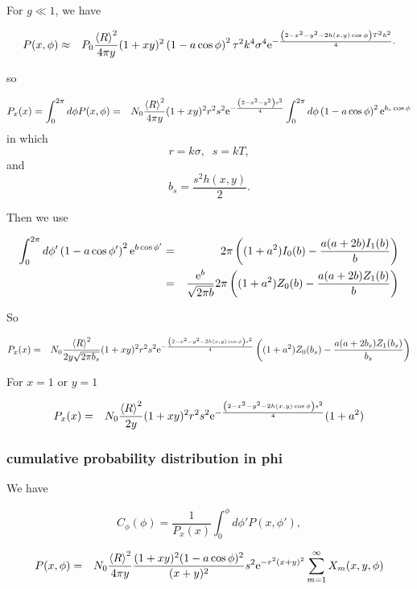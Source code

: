 \documentclass[11pt]{article}
\newcommand{\e}{{\rm e}}
\begin{document}
{{{{For $g\ll 1$, we have

\begin{eqnarray}
P(x,\phi)
&\approx&P_{0}\frac{\left<R\right>^{2}}{4\pi y}(1+xy)^{2}\left(1-a\cos\phi\right)^{2}\tau^{2}k^{4}\sigma^{4}\e^{-\frac{\left(2-x^{2}-y^{2}-2h(x,y)\cos\phi\right)T^{2}k^{2}}{4}.}
\end{eqnarray}

so

\begin{eqnarray}
P_{x}(x)=\int_{0}^{2\pi}d\phi P(x,\phi)&=& N_{0}\frac{\left<R\right>^{2}}{4\pi y}(1+xy)^{2}r^{2}s^{2}\e^{-\frac{\left(2-x^{2}-y^{2}\right)s^{2}}{4}}
\int_{0}^{2\pi}d\phi\left(1-a\cos\phi\right)^{2}\e^{b_{s}\cos\phi}
\end{eqnarray}
in which
$$r=k\sigma,\;\;s=kT,$$
and
$$b_{s}=\frac{s^{2}h(x,y)}{2}.$$

Then we use

\begin{eqnarray}
\int_{0}^{2\pi}d\phi'\left(1-a\cos\phi' \right)^{2}\e^{b\cos\phi'}&=&
2\pi\left((1+a^{2})I_{0}(b)-\frac{a(a+2b)I_{1}(b)}{b}\right)\\
&=&\frac{\e^{b}}{\sqrt{2\pi b}}2\pi\left((1+a^{2})Z_{0}(b)-\frac{a(a+2b)Z_{1}(b)}{b}\right)
\end{eqnarray}

So

\begin{eqnarray}
P_{x}(x)&=& N_{0}\frac{\left<R\right>^{2}}{2 y\sqrt{2\pi b_{s}}}(1+xy)^{2}r^{2}s^{2}\e^{-\frac{\left(2-x^{2}-y^{2}-2h(x,y)\cos\phi\right)s^{2}}{4}}
\left((1+a^{2})Z_{0}(b_{s})-\frac{a(a+2b_{s})Z_{1}(b_{s})}{b_{s}}\right)
\end{eqnarray}

For $x=1$ or $y=1$

\begin{eqnarray}
P_{x}(x)&=& N_{0}\frac{\left<R\right>^{2}}{2 y}(1+xy)^{2}r^{2}s^{2}\e^{-\frac{\left(2-x^{2}-y^{2}-2h(x,y)\cos\phi\right)s^{2}}{4}}
(1+a^{2})
\end{eqnarray}

\subsubsection{cumulative probability distribution in phi}
We have

$$C_{\phi}(\phi)=\frac{1}{P_x(x)}\int_{0}^{\phi}d\phi'P(x,\phi'),$$

\begin{eqnarray}
P(x,\phi)&=&
 N_{0}\frac{\left<R\right>^{2}}{4\pi y}\frac{(1+xy)^{2}(1-a\cos\phi)^{2}}{(x+y)^{2}}s^{2}\e^{-r^{2}(x+y)^{2}}\sum_{m=1}^{\infty}X_{m}(x,y,\phi)
\end{eqnarray}

}}}}
\end{document}
